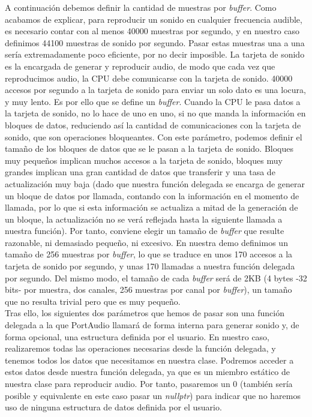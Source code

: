 A continuación debemos definir la cantidad de muestras por \emph{buffer}. Como acabamos de explicar, para reproducir un sonido en cualquier frecuencia audible, es necesario contar con al menos 40000 muestras por segundo, y en nuestro caso definimos 44100 muestras de sonido por segundo. Pasar estas muestras una a una sería extremadamente poco eficiente, por no decir imposible. La tarjeta de sonido es la encargada de generar y reproducir audio, de modo que cada vez que reproducimos audio, la CPU debe comunicarse con la tarjeta de sonido. 40000 accesos por segundo a la tarjeta de sonido para enviar un solo dato es una locura, y muy lento. Es por ello que se define un \emph{buffer}. Cuando la CPU le pasa datos a la tarjeta de sonido, no lo hace de uno en uno, si no que manda la información en bloques de datos, reduciendo así la cantidad de comunicaciones con la tarjeta de sonido, que son operaciones bloqueantes. Con este parámetro, podemos definir el tamaño de los bloques de datos que se le pasan a la tarjeta de sonido. Bloques muy pequeños implican muchos accesos a la tarjeta de sonido, bloques muy grandes implican una gran cantidad de datos que transferir y una tasa de actualización muy baja (dado que nuestra función delegada se encarga de generar un bloque de datos por llamada, contando con la información en el momento de llamada, por lo que si esta información se actualiza a mitad de la generación de un bloque, la actualización no se verá reflejada hasta la siguiente llamada a nuestra función). Por tanto, conviene elegir un tamaño de \emph{buffer} que resulte razonable, ni demasiado pequeño, ni excesivo. En nuestra demo definimos un tamaño de 256 muestras por \emph{buffer}, lo que se traduce en unos 170 accesos a la tarjeta de sonido por segundo, y unas 170 llamadas a nuestra función delegada por segundo. Del mismo modo, el tamaño de cada \emph{buffer} será de 2KB (4 bytes -32 bits- por muestra, dos canales, 256 muestras por  canal por \emph{buffer}), un tamaño que no resulta trivial pero que es muy pequeño.\\

Tras ello, los siguientes dos parámetros que hemos de pasar son una función delegada a la que PortAudio llamará de forma interna para generar sonido y, de forma opcional, una estructura definida por el usuario. En nuestro caso, realizaremos todas las operaciones necesarias desde la función delegada, y tenemos todos los datos que necesitamos en nuestra clase. Podremos acceder a estos datos desde nuestra función delegada, ya que es un miembro estático de nuestra clase para reproducir audio. Por tanto, pasaremos un 0 (también sería posible y equivalente en este caso pasar un \emph{nullptr}) para indicar que no haremos uso de ninguna estructura de datos definida por el usuario.\\

